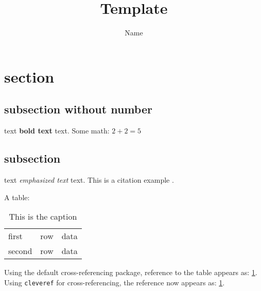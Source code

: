 \documentclass[11pt]{article}
\title{Template}
\author{Name}
\begin{document}
\maketitle

\section{section}
\subsection*{subsection without number}
text \textbf{bold text} text. Some math: $2+2=5$


\subsection{subsection}
text \emph{emphasized text} text. This is a citation example \cite{WC:1953}.

A table:
\begin{table}[h]
\begin{tabular}{|l|c|r|}
\hline
first  &  row  &  data \\
second &  row  &  data \\
\hline
\end{tabular}
\caption{This is the caption}
\label{ex:table}
\end{table}

Using the default cross-referencing package, reference to the table appears as: \ref{ex:table}.\\
Using \texttt{cleveref} for cross-referencing, the reference now appears as: \cref{ex:table}.



\end{document}

